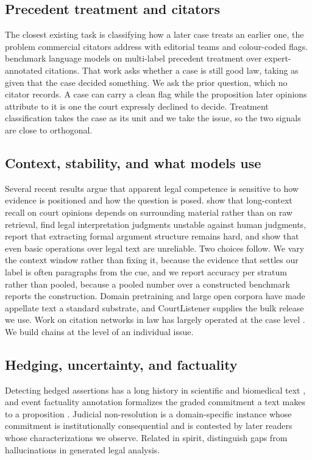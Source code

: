 \documentclass[11pt]{article}
\begin{document}
\subsection{Precedent treatment and citators} The closest existing task is
classifying how a later case treats an earlier one, the problem commercial
citators address with editorial teams and colour-coded flags.
\citet{demir2025validate} benchmark language models on multi-label precedent
treatment over expert-annotated citations. That work asks whether a case is still
good law, taking as given that the case decided something. We ask the prior
question, which no citator records. A case can carry a clean flag while the
proposition later opinions attribute to it is one the court expressly declined to
decide. Treatment classification takes the case as its unit and we take the
issue, so the two signals are close to orthogonal.

\subsection{Context, stability, and what models use} Several recent
results argue that apparent legal competence is sensitive to how evidence is
positioned and how the question is posed. \citet{xia2025haystack} show that
long-context recall on court opinions depends on surrounding material rather than
on raw retrieval, \citet{purushothama2025bench} find legal interpretation
judgments unstable against human judgments, \citet{held2025formal} report that
extracting formal argument structure remains hard, and
\citet{blairstanek2024blt} show that even basic operations over legal text are
unreliable. Two choices follow. We vary the context window rather than fixing it,
because the evidence that settles our label is often paragraphs from the cue, and
we report accuracy per stratum rather than pooled, because a pooled number over a
constructed benchmark reports the construction. Domain pretraining
\citep{chalkidis2020legalbert} and large open corpora \citep{henderson2022pile}
have made appellate text a standard substrate, and CourtListener \citep{cl}
supplies the bulk release we use. Work on citation networks in law has largely
operated at the case level \citep{fowler2007network, black2013citation}. We build
chains at the level of an individual issue.

\subsection{Hedging, uncertainty, and factuality} Detecting hedged assertions has
a long history in scientific and biomedical text \citep{farkas2010conll,
vincze2008bioscope}, and event factuality annotation formalizes the graded
commitment a text makes to a proposition \citep{sauri2009factbank,
rudinger2018neural}. Judicial non-resolution is a domain-specific instance whose
commitment is institutionally consequential and is contested by later readers
whose characterizations we observe. Related in spirit, \citet{hou2024gaps}
distinguish gaps from hallucinations in generated legal analysis.
\end{document}
